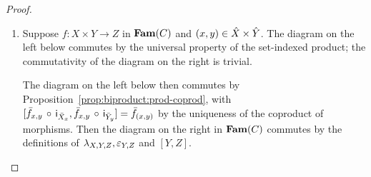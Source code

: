 \begin{proof}
\begin{enumerate}
.

\item Suppose $f: X \times Y \to Z$ in $\mathbf{Fam}(C)$ and $(x, y) \in \hat{X} \times \hat{Y}$. The diagram on the
left below commutes by the universal property of the set-indexed product; the commutativity of the diagram on
the right is trivial.

\begin{center}
\hspace{1cm}
\end{center}

The diagram on the left below then commutes by Proposition~\ref{prop:biproduct:prod-coprod}, with
$[\bar{f}_{x,y}\,\circ\,\mathsf{i}_{\bar{X}_x}, \bar{f}_{x,y}\,\circ\,\mathsf{i}_{\bar{Y}_y}] =
\bar{f}_{(x,y)}$ by the uniqueness of the coproduct of morphisms. Then the diagram on the right in $\mathbf{Fam}(C)$
commutes by the definitions of $\lambda_{X,Y,Z}, \varepsilon_{Y,Z}$ and $[Y,Z]$.

\begin{center}
\hspace{1cm}
\end{center}
\end{enumerate}
\end{proof}
